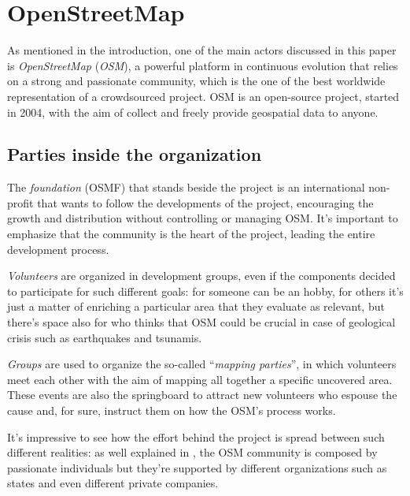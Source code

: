 \section{OpenStreetMap}
As mentioned in the introduction, one of the main actors discussed in this paper is \textit{OpenStreetMap} (\textit{OSM})\cite{haklay2008openstreetmap}, a powerful platform in continuous evolution that relies on a strong and passionate community, which is the one of the best worldwide representation of a crowdsourced project\cite{chilton2009crowdsourcing}.
OSM is an open-source project, started in 2004, with the aim of collect and freely provide geospatial data to anyone.

\subsection{Parties inside the organization}
The \textit{foundation} (OSMF) that stands beside the project is an international non-profit that wants to follow the developments of the project, encouraging the growth and distribution without controlling or managing OSM. It's important to emphasize that the community is the heart of the project, leading the entire development process.

\textit{Volunteers} are organized in development groups, even if the components decided to participate for such different goals: for someone can be an hobby, for others it's just a matter of enriching a particular area that they evaluate as relevant, but there's space also for who thinks that OSM could be crucial in case of geological crisis such as earthquakes and tsunamis.

\textit{Groups} are used to organize the so-called ``\textit{mapping parties}'', in which volunteers meet each other with the aim of mapping all together a specific uncovered area. These events are also the springboard to attract new volunteers who espouse the cause and, for sure, instruct them on how the OSM's process works.

It's impressive to see how the effort behind the project is spread between such different realities: as well explained in \cite{haklay2008openstreetmap}, the OSM community is composed by passionate individuals but they're supported by different organizations such as states and even different private companies.

